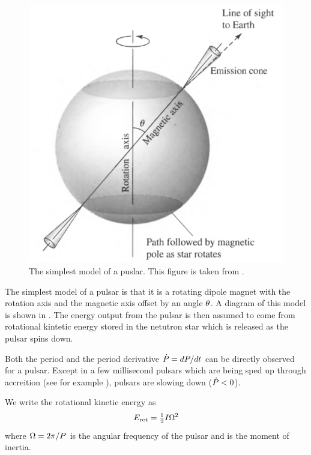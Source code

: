 \begin{figure}[htpb]
  \begin{center}
    \includegraphics[width=\textwidth]{chapters/introduction/figures/pulsar_model.pdf}
  \end{center}
  \caption{The simplest model of a puslar. This
  figure is taken from \citep{carroll_2006_introduction-modern}.
  }
\end{figure}

The simplest model of a pulsar is that it is a rotating dipole magnet
with the rotation axis and the magnetic axis offset by an angle
$\theta$.
A diagram of this model is shown in .
The energy output from the pulsar is
then assumed 
to come from rotational kintetic energy stored in
the netutron star which is released as the pulsar
spins down. 

Both the period \period and the period derivative
$\dot{P}=dP/dt$ can be directly observed for a pulsar.
Except in a few millisecond pulsars which are being sped up
through accreition (see for example \cite{falanga_2005_integral-observations}),
pulsars are slowing down ($\dot{P}<0$).

We write the rotational kinetic energy as
\begin{equation}\eqnlabel{rotational_energy}
  \energyrotational = \tfrac{1}{2} I \angularfrequency^2
\end{equation}
where $\Omega = 2\pi/P$ is
the angular frequency of the pulsar and
\momentofinertia is the moment of inertia.

